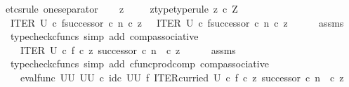 \begin{isabellebody}
%
\endisadelimproof
%
\isatagproof
{}\isamarkupfalse%
{\isacharparenleft}{\kern0pt}etcs{\isacharunderscore}{\kern0pt}rule\ one{\isacharunderscore}{\kern0pt}separator{\isacharparenright}{\kern0pt}\isanewline
\ \ \isamarkupfalse%
\ z\ \isanewline
\ \ \isamarkupfalse%
\ z{\isacharunderscore}{\kern0pt}type{\isacharbrackleft}{\kern0pt}type{\isacharunderscore}{\kern0pt}rule{\isacharbrackright}{\kern0pt}{\isacharcolon}{\kern0pt}\ {\isachardoublequoteopen}z\ {\isasymin}\isactrlsub c\ Z{\isachardoublequoteclose}\isanewline
\ \ \isamarkupfalse%
\ {\isachardoublequoteopen}{\isacharparenleft}{\kern0pt}ITER\ U\ {\isasymcirc}\isactrlsub c\ {\isasymlangle}f{\isacharcomma}{\kern0pt}successor\ {\isasymcirc}\isactrlsub c\ n{\isasymrangle}{\isacharparenright}{\kern0pt}\ {\isasymcirc}\isactrlsub c\ z\ \ {\isacharequal}{\kern0pt}\ ITER\ U\ {\isasymcirc}\isactrlsub c\ {\isasymlangle}f{\isacharcomma}{\kern0pt}successor\ {\isasymcirc}\isactrlsub c\ n{\isasymrangle}\ {\isasymcirc}\isactrlsub c\ z{\isachardoublequoteclose}\isanewline
\ \ \ \ \isamarkupfalse%
\ assms\ \isamarkupfalse%
\ {\isacharparenleft}{\kern0pt}typecheck{\isacharunderscore}{\kern0pt}cfuncs{\isacharcomma}{\kern0pt}\ simp\ add{\isacharcolon}{\kern0pt}\ comp{\isacharunderscore}{\kern0pt}associative{}{\isacharparenright}{\kern0pt}\isanewline
\ \ \isamarkupfalse%
\ \isamarkupfalse%
\ {\isachardoublequoteopen}{\isachardot}{\kern0pt}{\isachardot}{\kern0pt}{\isachardot}{\kern0pt}\ {\isacharequal}{\kern0pt}\ ITER\ U\ {\isasymcirc}\isactrlsub c\ {\isasymlangle}f\ {\isasymcirc}\isactrlsub c\ z{\isacharcomma}{\kern0pt}\ successor\ {\isasymcirc}\isactrlsub c\ {\isacharparenleft}{\kern0pt}n\ \ {\isasymcirc}\isactrlsub c\ z{\isacharparenright}{\kern0pt}{\isasymrangle}{\isachardoublequoteclose}\isanewline
\ \ \ \ \isamarkupfalse%
\ assms\ \isamarkupfalse%
\ {\isacharparenleft}{\kern0pt}typecheck{\isacharunderscore}{\kern0pt}cfuncs{\isacharcomma}{\kern0pt}\ simp\ add{\isacharcolon}{\kern0pt}\ cfunc{\isacharunderscore}{\kern0pt}prod{\isacharunderscore}{\kern0pt}comp\ comp{\isacharunderscore}{\kern0pt}associative{}{\isacharparenright}{\kern0pt}\isanewline
\ \ \isamarkupfalse%
\ \isamarkupfalse%
\ {\isachardoublequoteopen}{\isachardot}{\kern0pt}{\isachardot}{\kern0pt}{\isachardot}{\kern0pt}\ {\isacharequal}{\kern0pt}\ {\isacharparenleft}{\kern0pt}eval{\isacharunderscore}{\kern0pt}func\ {\isacharparenleft}{\kern0pt}U\isactrlbsup U\isactrlesup {\isacharparenright}{\kern0pt}\ {\isacharparenleft}{\kern0pt}U\isactrlbsup U\isactrlesup {\isacharparenright}{\kern0pt}{\isacharparenright}{\kern0pt}\ {\isasymcirc}\isactrlsub c\ {\isacharparenleft}{\kern0pt}id\isactrlsub c\ {\isacharparenleft}{\kern0pt}U\isactrlbsup U\isactrlesup {\isacharparenright}{\kern0pt}\ {\isasymtimes}\isactrlsub f\ ITER{\isacharunderscore}{\kern0pt}curried\ U{\isacharparenright}{\kern0pt}\ {\isasymcirc}\isactrlsub c\ {\isasymlangle}f\ {\isasymcirc}\isactrlsub c\ z{\isacharcomma}{\kern0pt}\ successor\ {\isasymcirc}\isactrlsub c\ {\isacharparenleft}{\kern0pt}n\ \ {\isasymcirc}\isactrlsub c\ z{\isacharparenright}{\kern0pt}{\isasymrangle}{\isachardoublequoteclose}\isanewline

\end{isabellebody}
